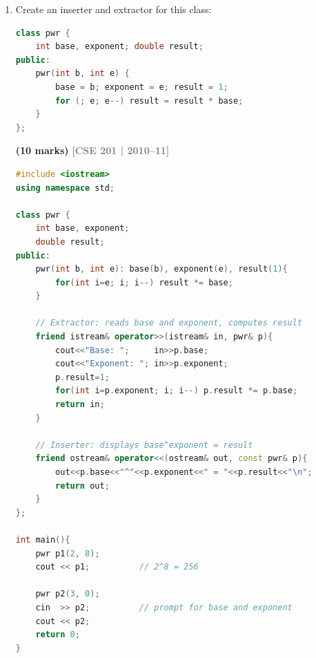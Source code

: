 \documentclass[12pt,a3paper]{article}
\newcommand{\yr}[1]{\hfill\textcolor{gray}{\small\textbf{[#1]}}}
\newcommand{\mk}[1]{\textcolor{orange!70!black}{\small\textbf{(#1 marks)}}}
\begin{document}
\begin{enumerate}
\begin{tcolorbox}
\begin{lstlisting}[language=C++]
    for(int i=2; i<=100; i++){
        cout << setw(6)<< i << setw(12) << setprecision(5) << fixed << log((double)i) << setw(12) << setprecision(5) << fixed << log10((double)i)<< "\n";
    }
    return 0;
}
\end{lstlisting}

\end{tcolorbox}

\item Create an inserter and extractor for this class:
\begin{lstlisting}[language=C++]
class pwr {
    int base, exponent; double result;
public:
    pwr(int b, int e) {
        base = b; exponent = e; result = 1;
        for (; e; e--) result = result * base;
    }
};
\end{lstlisting}
\mk{10}
\yr{CSE 201 | 2010--11}
\begin{tcolorbox}[enhanced,breakable,ansbox,colback=cA!4,colframe=cA,
  boxrule=0.8pt,arc=5pt,
  title={\textbf{Answer --- pwr class inserter and extractor}},
  fonttitle=\bfseries\color{white},colbacktitle=cA]

\begin{lstlisting}[language=C++]
#include <iostream>
using namespace std;

class pwr {
    int base, exponent;
    double result;
public:
    pwr(int b, int e): base(b), exponent(e), result(1){
        for(int i=e; i; i--) result *= base;
    }

    // Extractor: reads base and exponent, computes result
    friend istream& operator>>(istream& in, pwr& p){
        cout<<"Base: ";     in>>p.base;
        cout<<"Exponent: "; in>>p.exponent;
        p.result=1;
        for(int i=p.exponent; i; i--) p.result *= p.base;
        return in;
    }

    // Inserter: displays base^exponent = result
    friend ostream& operator<<(ostream& out, const pwr& p){
        out<<p.base<<"^"<<p.exponent<<" = "<<p.result<<"\n";
        return out;
    }
};

int main(){
    pwr p1(2, 8);
    cout << p1;          // 2^8 = 256

    pwr p2(3, 0);
    cin  >> p2;          // prompt for base and exponent
    cout << p2;
    return 0;
}
\end{lstlisting}

\end{tcolorbox}



\end{enumerate}
\newpage
\end{document}
